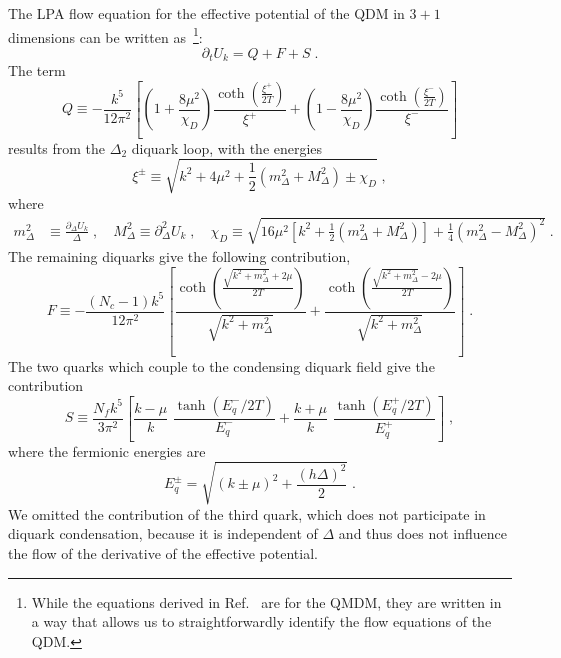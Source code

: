 \documentclass[
onecolumn,
aps,
prd,
amsmath,
amssymb,
nofootinbib
]{revtex4-2}
\begin{document}
 The LPA flow equation for the effective potential of the QDM in $3+1$ dimensions can be written as~\cite{Sattler:2025hcg,stoll2025nonperturbative}\footnote{While the equations derived in Ref.~\cite{Sattler:2025hcg} are for the QMDM, they are written in a way that allows us to straightforwardly identify the flow equations of the QDM.}:
\begin{equation}
\label{eq:flow_U}
	\partial_t U_k = Q + F + S\;.
\end{equation}
The term
\begin{equation}
	Q \equiv -\frac{k^5}{12\pi^2}\left[ \left(1+\frac{8\mu^2}{\chi_D}\right)\frac{\coth\left(\frac{\xi^+}{2T}\right)}{\xi^+}+\left(1-\frac{8\mu^2}{\chi_D}\right)\frac{\coth\left(\frac{\xi^-}{2T}\right)}{\xi^-}\right]\label{eq:Diff}
\end{equation}
results from the $\Delta_2$ diquark loop, with the energies
\begin{equation}
\xi^\pm \equiv \sqrt{k^2+4\mu^2+\frac{1}{2}\left(m_\Delta^2+M_\Delta^2\right) \pm \chi_D}\;,\label{eq:Diff_E_pm}
\end{equation}
where
\begin{align}\label{eq:masses}
m_\Delta^2 & \equiv \frac{\partial_\Delta U_k}{\Delta}\;,\quad M_\Delta^2 \equiv \partial_\Delta^2 U_k\;, \quad
\chi_D  \equiv \sqrt{16\mu^2\left[k^2+\frac{1}{2}\left(m_\Delta^2+M_\Delta^2\right)\right]+\frac{1}{4}\left(m_\Delta^2-M_\Delta^2\right)^2}\;.
\end{align}
The remaining diquarks give the following contribution,
\begin{equation}
	F	\equiv -\frac{(N_c-1)k^5}{12\pi^2}\left[\frac{\coth\left(\frac{\sqrt{k^2+m_\Delta^2}+2\mu}{2T}\right)}{\sqrt{k^2+m_\Delta^2}} +\frac{\coth\left(\frac{\sqrt{k^2+m_\Delta^2}-2\mu}{2T}\right)}{\sqrt{k^2+m_\Delta^2}}\right]\label{eq:Adv_E_m} \; .    
\end{equation}
The two quarks which couple to the condensing diquark field give the contribution 
\begin{equation}
		S \equiv \frac{N_fk^5}{3\pi^2}\left[\frac{k-\mu}{k}\,\,\frac{\tanh\left(E_q^-/2T\right)}{E_q^-}+\frac{k+\mu}{k}\,\,\frac{\tanh\left(E_q^+/2T\right)}{E_q^+}\right]\;,
        \end{equation}
where the fermionic energies are
\begin{equation}
        E_q^\pm = \sqrt{(k\pm\mu)^2 + \frac{(h\Delta)^2}{2}}\;.
\end{equation}
We omitted the contribution of the third quark, which does not participate in diquark condensation, because it is independent of $\Delta$ and thus does not influence the flow of the derivative of the effective potential. 
\end{document}
